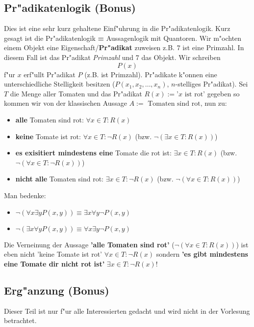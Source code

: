 \subsection{Pr"adikatenlogik (Bonus)}
Dies ist eine sehr kurz gehaltene Einf"uhrung in die Pr"adikatenlogik. Kurz gesagt ist die Pr"adikatenlogik \textbf{=} Aussagenlogik mit Quantoren. Wir m"ochten einem Objekt eine Eigenschaft/\textbf{Pr"adikat} zuweisen z.B. $7$ ist eine Primzahl. In diesem Fall ist das Pr"adikat \textit{Primzahl} und $7$ das Objekt. Wir schreiben 
\begin{equation*}
P(x)
\end{equation*}
f"ur $x$ erf"ullt Pr"adikat $P$ (z.B. ist Primzahl). Pr"adikate k"onnen eine unterschiedliche Stelligkeit besitzen ($P(x_1, x_2, \ldots, x_n)$, $n$-stelliges Pr"adikat). Sei $T$ die Menge aller Tomaten und das Pr"adikat $R(x):= \text{'}x \text{ ist rot'}$ gegeben so kommen wir von der klassischen Aussage $A := \text{ Tomaten sind rot,} $ nun zu:
\begin{itemize}
\item \textbf{alle} Tomaten sind rot: $\forall x \in T : R(x)$
\item \textbf{keine} Tomate ist rot: $\forall x \in T : \neg R(x)$ (bzw. $\neg (\exists x \in T : R(x))$)
\item \textbf{es exisitiert mindestens eine} Tomate die rot ist: $\exists x \in T : R(x)$ (bzw. $\neg (\forall x \in T : \neg R(x))$)
\item \textbf{nicht alle} Tomaten sind rot: $\exists x \in T : \neg R(x)$ (bzw. $\neg (\forall x \in T : R(x))$)
\end{itemize}
Man bedenke:
\begin{itemize}
\item $ \neg (\forall x \exists y P(x, y)) \equiv \exists x \forall y \neg P(x, y)$
\item $ \neg (\exists x \forall y P(x, y)) \equiv \forall x \exists y \neg P(x, y)$
\end{itemize}
Die Verneinung der Aussage \textbf{'alle Tomaten sind rot'} ($\neg (\forall x \in T : R(x))$) ist eben nicht 'keine Tomate ist rot' $\forall x \in T : \neg R(x)$ sondern \textbf{'es gibt mindestens eine Tomate dir nicht rot ist'} $ \exists x \in T : \neg R(x)$!

\subsection{Erg"anzung (Bonus)}
Dieser Teil ist nur f"ur alle Interessierten gedacht und wird nicht in der Vorlesung betrachtet.

